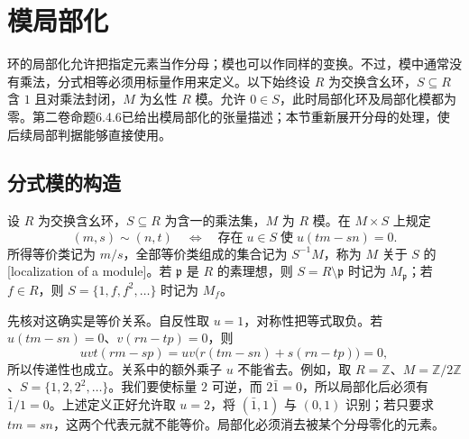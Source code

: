 
\section{模局部化}
\label{b3:sec:0201}

环的局部化允许把指定元素当作分母；模也可以作同样的变换。不过，模中通常没有乘法，分式相等必须用标量作用来定义。以下始终设 \(R\) 为交换含幺环，\(S\subseteq R\) 含 \(1\) 且对乘法封闭，\(M\) 为幺性 \(R\) 模。允许 \(0\in S\)，此时局部化环及局部化模都为零。第二卷命题6.4.6已给出模局部化的张量描述；本节重新展开分母的处理，使后续局部判据能够直接使用。

\subsection{分式模的构造}
\label{b3:subsec:0201:01}

\begin{definition}\label{b3:def:module-localization}
	设 \(R\) 为交换含幺环，\(S\subseteq R\) 为含一的乘法集，\(M\) 为 \(R\) 模。在 \(M\times S\) 上规定
	\[
		(m,s)\sim(n,t) \quad\Longleftrightarrow\quad \text{存在}\;u\in S\;\text{使}\;u(tm-sn)=0.
	\]
	所得等价类记为 \(m/s\)，全部等价类组成的集合记为 \(S^{-1}M\)，称为 \(M\) 关于 \(S\) 的[localization of a module]。若 \(\mathfrak p\) 是 \(R\) 的素理想，则 \(S=R\setminus\mathfrak p\) 时记为 \(M_{\mathfrak p}\)；若 \(f\in R\)，则 \(S=\{1,f,f^2,\ldots\}\) 时记为 \(M_f\)。
\end{definition}

先核对这确实是等价关系。自反性取 \(u=1\)，对称性把等式取负。若 \(u(tm-sn)=0\)、\(v(rn-tp)=0\)，则
\[
	uvt(rm-sp)=uv\bigl(r(tm-sn)+s(rn-tp)\bigr)=0,
\]
所以传递性也成立。关系中的额外乘子 \(u\) 不能省去。例如，取 \(R=\mathbb Z\)、\(M=\mathbb Z/2\mathbb Z\)、\(S=\{1,2,2^2,\ldots\}\)。我们要使标量 \(2\) 可逆，而 \(2\bar1=0\)，所以局部化后必须有 \(\bar1/1=0\)。上述定义正好允许取 \(u=2\)，将 \((\bar1,1)\) 与 \((0,1)\) 识别；若只要求 \(tm=sn\)，这两个代表元就不能等价。局部化必须消去被某个分母零化的元素。

